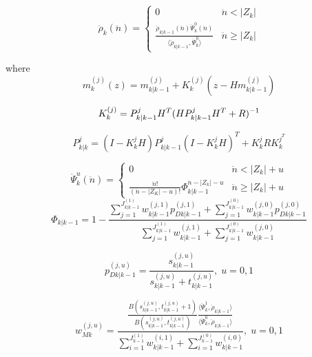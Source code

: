 \documentclass{article}
\newcommand{\clut}{{(0)}}
\newcommand{\tgt}{{(1)}}
\newcommand{\clutj}{{(j,0)}}
\newcommand{\tgtj}{{(j,1)}}
\newcommand{\cluti}{{(i,0)}}
\newcommand{\tgti}{{(i,1)}}
\begin{document}
\begin{equation}
  \label{eq:lpd_rhok}
  \ddot{\rho}_k(\ddot{n}) =
  \begin{cases}
    0 & \ddot{n} < |Z_k| \\
    \frac{ \ddot{\rho}_{k|k-1}(\ddot{n})\ddot{\Psi}_k^0(\ddot{n})}{\langle \ddot{\rho}_{k|k-1}, \ddot{\Psi}_k^0 \rangle  } & \ddot{n} \ge |Z_k|
  \end{cases}
\end{equation}

where
\begin{equation}
  \label{eq:lpd_mk}
  m_k^{(j)}(z) = m_{k|k-1}^{(j)} + K_k^{(j)}(z - Hm_{k|k-1}^{(j)})
\end{equation}

\begin{equation}
  \label{eq:lpd_kalman_gain}
  K_k^{(j)} = P_{k|k-1}^jH^T(HP_{k|k-1}^jH^T + R)^{-1}\\
\end{equation}

\begin{equation}
  \label{eq:lpd_Pk}
  P_{k|k}^j = (I - K_k^jH)P_{k|k-1}^j(I - K_k^jH)^T + K_k^jRK_k^{j^T}
\end{equation}

\begin{equation}
  \label{eq:lpd_psi}
  \ddot{\Psi}_k^u(\ddot{n}) =
  \begin{cases}
    0 & \ddot{n} < |Z_k| + u \\
   \frac{\ddot{n}!}{(\ddot{n}-|Z_K|-u)!}\Phi_{k|k-1}^{\ddot{n} - |Z_k|-u} & \ddot{n} \ge |Z_k|+u
  \end{cases}
\end{equation}
\begin{equation}
  \label{eq:lpd_Phi}
  \Phi_{k|k-1} = 1 - \frac{\sum_{j=1}^{J_{k|k-1}^\tgt}w_{k|k-1}^\tgtj p_{Dk|k-1}^\tgtj + \sum_{j=1}^{J_{k|k-1}^\clut}w_{k|k-1}^\clutj p_{Dk|k-1}^\clutj}
  {\sum_{j=1}^{J_{k|k-1}^\tgt}w_{k|k-1}^\tgtj + \sum_{j=1}^{J_{k|k-1}^\clut}w_{k|k-1}^\clutj}
\end{equation}

\begin{equation}
  \label{eq:pdkk1}
  p_{Dk|k-1}^{(j,u)} = \frac{ s_{k|k-1}^{(j, u)}}{s_{k|k-1}^{(j, u)} + t_{k|k-1}^{(j, u)}},\;u=0,1
\end{equation}


\begin{equation}
  \label{eq:lpd_wmk}
  w_{Mk}^{(j,u)} = \frac{
    \frac{B\left( s_{k|k-1}^{(j,u)},t_{k|k-1}^{(j,u)}+1\right)}{B\left( s_{k|k-1}^{(j,u)},t_{k|k-1}^{(j,u)}\right)}
    \frac{\langle\ddot{\Psi}_k^1,\ddot{\rho}_{k|k-1}\rangle}{\langle\ddot{\Psi}_k^0,\ddot{\rho}_{k|k-1}\rangle}  }
  {\sum_{i=1}^{J_{k-1}^\tgt}w_{k|k-1}^\tgti + \sum_{i=1}^{J_{k-1}^\clut}w_{k|k-1}^\cluti},\; u=0,1
\end{equation}
\end{document}
